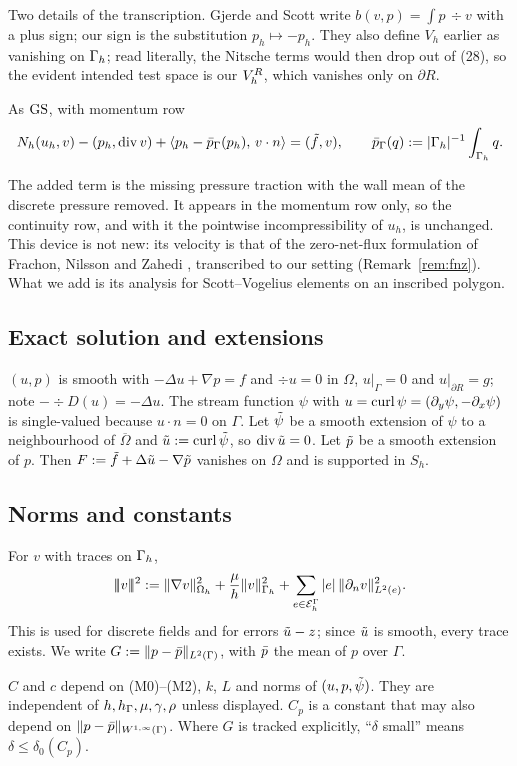 Two details of the transcription. Gjerde and Scott write $b(v,p)=\int p\,\div v$ with a plus sign; our sign is the substitution $p_h\mapsto-p_h$. They also define $V_h$ earlier as vanishing on $\Gamma_h$; read literally, the Nitsche terms would then drop out of (28), so the evident intended test space is our $V_h^R$, which vanishes only on $\partial R$.

\begin{definition}\label{def:cns}
As $\mathrm{GS}$, with momentum row
\[
N_h(u_h,v)-(p_h,\operatorname{div} v)+\langle p_h-\bar p_{\Gamma}(p_h),\, v\cdot n\rangle=(\tilde f,v),\qquad \bar p_{\Gamma}(q):=|\Gamma_h|^{-1}\int_{\Gamma_h}q .
\]
\end{definition}

The added term is the missing pressure traction with the wall mean of the discrete pressure removed. It appears in the momentum row only, so the continuity row, and with it the pointwise incompressibility of $u_h$, is unchanged. This device is not new: its velocity is that of the zero-net-flux formulation of Frachon, Nilsson and Zahedi \cite{FrachonNilssonZahedi2024}, transcribed to our setting (Remark~\ref{rem:fnz}). What we add is its analysis for Scott--Vogelius elements on an inscribed polygon.

\subsection*{Exact solution and extensions}
$(u,p)$ is smooth with $-\Delta u+\nabla p=f$ and $\div u=0$ in $\Omega$, $u|_\Gamma=0$ and $u|_{\partial R}=g$; note $-\div D(u)=-\Delta u$. The stream function $\psi$ with $u=\operatorname{curl}\psi=(\partial_y\psi,-\partial_x\psi)$ is single-valued because $u\cdot n=0$ on $\Gamma$.
Let $\tilde\psi$ be a smooth extension of $\psi$ to a neighbourhood of $\overline\Omega$ and $\tilde u:=\operatorname{curl}\tilde\psi$, so $\operatorname{div}\tilde u=0$. Let $\tilde p$ be a smooth extension of $p$. Then $F:=\tilde f+\Delta\tilde u-\nabla\tilde p$ vanishes on $\Omega$ and is supported in $S_h$.

\subsection*{Norms and constants}
For $v$ with traces on $\Gamma_h$,
\[
|\!|\!|v|\!|\!|^2:=\lVert \nabla v\rVert_{\Omega_h}^2+\frac{\mu}{h}\lVert v\rVert_{\Gamma_h}^2+\sum_{e\in\mathcal E_h^\Gamma}|e|\,\lVert \partial_n v\rVert_{L^2(e)}^2 .
\]
This is used for discrete fields and for errors $\tilde u-z$; since $\tilde u$ is smooth, every trace exists. We write $G:=\lVert p-\bar p\rVert_{L^2(\Gamma)}$, with $\bar p$ the mean of $p$ over $\Gamma$.

$C$ and $c$ depend on (M0)--(M2), $k$, $L$ and norms of $(u,p,\tilde\psi)$. They are independent of $h,h_\Gamma,\mu,\gamma,\rho$ unless displayed. $C_p$ is a constant that may also depend on $\lVert p-\bar p\rVert_{W^{1,\infty}(\Gamma)}$. Where $G$ is tracked explicitly, ``$\delta$ small'' means $\delta\le\delta_0(C_p)$.
